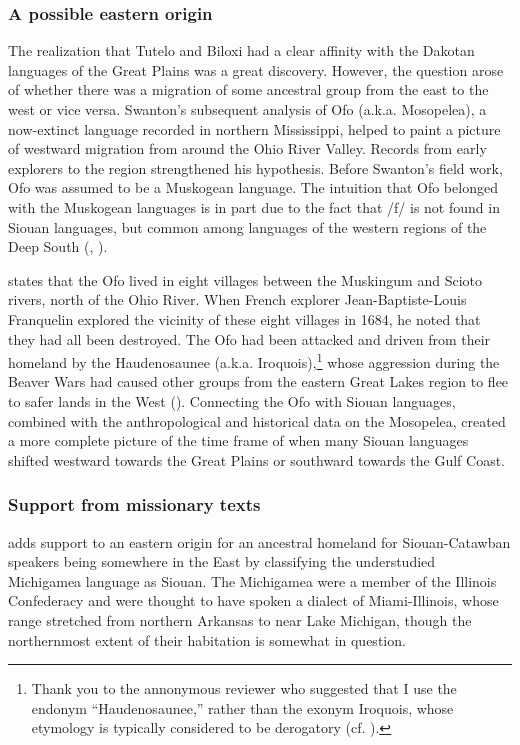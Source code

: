 \documentclass[output=paper]{LSP/langsci}
\begin{document}
\subsubsection{A possible eastern origin} The realization that Tutelo and Biloxi had a clear affinity with the Dakotan languages of the Great Plains was a great discovery. However, the question arose of whether there was a migration of some ancestral group from the east to the west or vice versa. Swanton's \citeyear{Swanton1909} subsequent analysis of Ofo (a.k.a. Mosopelea), a now-extinct language recorded in northern Mississippi, helped to paint a picture of westward migration from around the Ohio River Valley. Records from early explorers to the region strengthened his hypothesis. Before Swanton's field work, Ofo was assumed to be a Muskogean language. The intuition that Ofo belonged with the Muskogean languages is in part due to the fact that /f/ is not found in Siouan languages, but common among languages of the western regions of the Deep South (\citealt{Rankin2004ofo}, \citealt{Kaufman2014}). 

\citet{Hanna1911} states that the Ofo lived in eight villages between the Muskingum and Scioto rivers, north of the Ohio River. When French explorer Jean-Baptiste-Louis Franquelin explored the vicinity of these eight villages in 1684, he noted that they had all been destroyed. The Ofo had been attacked and driven from their homeland by the Haudenosaunee (a.k.a. Iroquois),\footnote{Thank you to the annonymous reviewer who suggested that I use the endonym ``Haudenosaunee,'' rather than the exonym Iroquois, whose etymology is typically considered to be derogatory (cf. \citealt{Day1968}).} whose aggression during the Beaver Wars had caused other groups from the eastern Great Lakes region to flee to safer lands in the West (\citealt{Swanton1952}). Connecting the Ofo with Siouan languages, combined with the anthropological and historical data on the Mosopelea, created a more complete picture of the time frame of when many Siouan languages shifted westward towards the Great Plains or southward towards the Gulf Coast. 

\subsubsection{Support from missionary texts} \citet{Koontz1995a,Koontz1995b} adds support to an eastern origin for an ancestral homeland for Siouan-Catawban speakers being somewhere in the East by classifying the understudied Michigamea language  as Siouan. The Michigamea were a member of the Illinois Confederacy and were thought to have spoken a dialect of Miami-Illinois, whose range stretched from northern Arkansas to near Lake Michigan, though the northernmost extent of their habitation is somewhat in question. 
\end{document}
